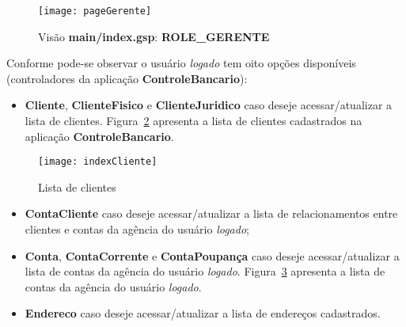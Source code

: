 \vspace{0.2cm}

\begin{figure}[htbp]
\centering\texttt{[image: pageGerente]}
\caption{Visão {\bf main/index.gsp}: {\bf ROLE\_GERENTE}}
\label{figPageGerente}
\end{figure}

Conforme pode-se  observar o  usuário {\it logado}  tem oito  opções disponíveis
(controladores da aplicação {\bf ControleBancario}): 

\vspace{0.4cm}

\begin{itemize}

\item  {\bf Cliente}, {\bf  ClienteFisico} e  {\bf ClienteJuridico}  caso deseje
  acessar/atualizar a lista  de clientes. Figura~\ref{indexClienteFig} apresenta
  a lista de clientes cadastrados na aplicação {\bf ControleBancario}.

\end{itemize}

\vspace{0.4cm}

\begin{figure}[htbp]
\centering\texttt{[image: indexCliente]}
\caption{Lista de clientes}
\label{indexClienteFig}
\end{figure}

\vspace{0.4cm}

\begin{itemize}

\item   {\bf   ContaCliente}   caso   deseje  acessar/atualizar   a   lista   de
  relacionamentos entre clientes e contas da agência do usuário {\it logado};

\vspace{0.4cm}

\item  {\bf  Conta},  {\bf  ContaCorrente}  e {\bf  ContaPoupança}  caso  deseje
  acessar/atualizar  a lista  de  contas  da agência  do  usuário {\it  logado}.
  Figura~\ref{indexContaFig} apresenta  a lista de contas da  agência do usuário
  {\it logado}.  

\end{itemize}

\vspace{0.4cm}

\begin{itemize}

\begin{figure}[htbp]
\centering\texttt{[image: indexConta]}
\caption{Lista de contas da agência do usuário {\it logado}}
\label{indexContaFig}
\end{figure}

\vspace{0.4cm}

\item  {\bf  Endereco}  caso  deseje  acessar/atualizar  a  lista  de  endereços
  cadastrados.
 
\end{itemize}

